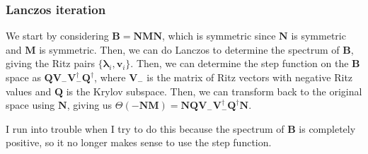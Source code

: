 \subsubsection{Lanczos iteration}
We start by considering $\bm{B} = \bm{N}\bm{M}\bm{N}$, which is symmetric since $\bm{N}$ is symmetric and $\bm{M}$ is symmetric. Then, we can do Lanczos to determine the spectrum of $\bm{B}$, giving the Ritz pairs $\{\bm{\lambda}_i, \bm{v}_i\}$. Then, we can determine the step function on the $\bm{B}$ space as $\bm{Q}\bm{V}_- \bm{V}_-^\dagger \bm{Q}^\dagger$, where $\bm{V}_-$ is the matrix of Ritz vectors with negative Ritz values and $\bm{Q}$ is the Krylov subspace. Then, we can transform back to the original space using $\bm{N}$, giving us $\Theta(-\bm{N}\bm{M})=\bm{N}\bm{Q}\bm{V}_- \bm{V}_-^\dagger \bm{Q}^\dagger\bm{N}$.
\begin{tcolorbox}[colback=red!10!white, colframe=red!50!black]
 I run into trouble when I try to do this because the spectrum of $\bm{B}$ is completely positive, so it no longer makes sense to use the step function.
\end{tcolorbox}
